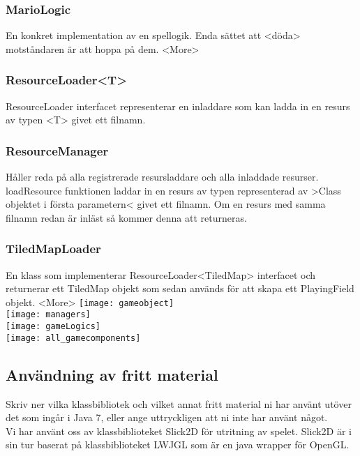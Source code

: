 \subsubsection{MarioLogic}
En konkret implementation av en spellogik. Enda sättet att <döda> motståndaren är att hoppa på dem. <More>\\
\subsubsection{ResourceLoader<T>}
ResourceLoader interfacet representerar en inladdare som kan ladda in en resurs av typen <T> givet ett filnamn.\\
\subsubsection{ResourceManager}
Håller reda på alla registrerade resursladdare och alla inladdade resurser.\\
loadResource funktionen laddar in en resurs av typen representerad av >Class objektet i första parametern< givet ett filnamn. Om en resurs med samma filnamn redan är inläst så kommer denna att returneras.\\
\subsubsection{TiledMapLoader}
En klass som implementerar ResourceLoader<TiledMap> interfacet och returnerar ett TiledMap objekt som sedan används för att skapa ett PlayingField objekt. <More>
\texttt{[image: gameobject]}\\
\texttt{[image: managers]}\\
\texttt{[image: gameLogics]}\\
\texttt{[image: all\_gamecomponents]}\\
\subsection{Användning av fritt material}
{\color{red}Skriv ner vilka klassbibliotek och vilket annat fritt material ni har använt utöver det som ingår i Java 7, eller ange uttryckligen att ni inte har använt något.\\}
Vi har använt oss av klassbiblioteket Slick2D för utritning av spelet. Slick2D är i sin tur baserat på klassbiblioteket LWJGL som är en java wrapper för OpenGL.
